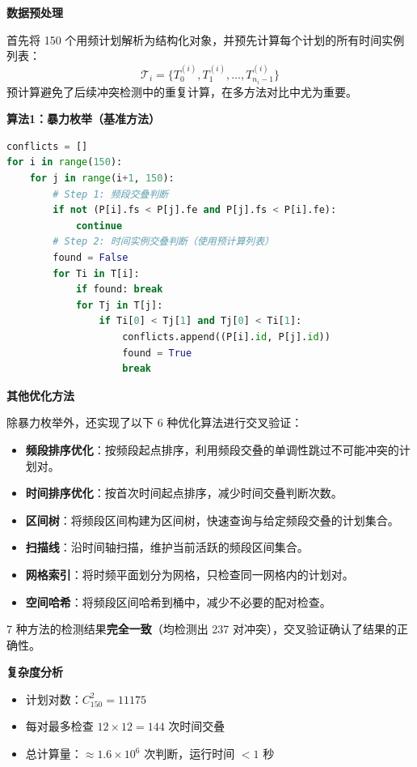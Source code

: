 
\textbf{数据预处理}

首先将 150 个用频计划解析为结构化对象，并预先计算每个计划的所有时间实例列表：
\begin{equation}
    \mathcal{T}_i = \{T_0^{(i)}, T_1^{(i)}, \ldots, T_{n_i-1}^{(i)}\}
\end{equation}
预计算避免了后续冲突检测中的重复计算，在多方法对比中尤为重要。

\textbf{算法1：暴力枚举（基准方法）}

\begin{lstlisting}[language=Python, caption=暴力枚举时频冲突检测]
conflicts = []
for i in range(150):
    for j in range(i+1, 150):
        # Step 1: 频段交叠判断
        if not (P[i].fs < P[j].fe and P[j].fs < P[i].fe):
            continue
        # Step 2: 时间实例交叠判断（使用预计算列表）
        found = False
        for Ti in T[i]:
            if found: break
            for Tj in T[j]:
                if Ti[0] < Tj[1] and Tj[0] < Ti[1]:
                    conflicts.append((P[i].id, P[j].id))
                    found = True
                    break
\end{lstlisting}

\textbf{其他优化方法}

除暴力枚举外，还实现了以下 6 种优化算法进行交叉验证：
\begin{itemize}
    \item \textbf{频段排序优化}：按频段起点排序，利用频段交叠的单调性跳过不可能冲突的计划对。
    \item \textbf{时间排序优化}：按首次时间起点排序，减少时间交叠判断次数。
    \item \textbf{区间树}：将频段区间构建为区间树，快速查询与给定频段交叠的计划集合。
    \item \textbf{扫描线}：沿时间轴扫描，维护当前活跃的频段区间集合。
    \item \textbf{网格索引}：将时频平面划分为网格，只检查同一网格内的计划对。
    \item \textbf{空间哈希}：将频段区间哈希到桶中，减少不必要的配对检查。
\end{itemize}

7 种方法的检测结果\textbf{完全一致}（均检测出 237 对冲突），交叉验证确认了结果的正确性。

\textbf{复杂度分析}

\begin{itemize}
    \item 计划对数：$C_{150}^{2} = 11175$
    \item 每对最多检查 $12 \times 12 = 144$ 次时间交叠
    \item 总计算量：$\approx 1.6 \times 10^6$ 次判断，运行时间 $< 1$ 秒
\end{itemize}

